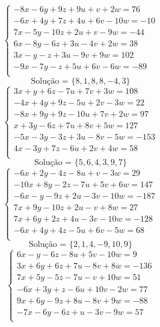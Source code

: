 \documentclass[12pt,oneside,a4paper]{article}
\begin{document}
\vspace{\baselineskip}
\begin{equation*}
\begin{cases}
-8x-6y+9z+9u+v+2w=76 \\
-6x+4y+7z+4u+6v-10w=-10 \\
7x-5y-10z+2u+v-9w=-44 \\
6x-8y-6z+3u-4v+2w=38 \\
3x-y-z+3u-9v+9w=102 \\
-9x-7y-z+5u+6v-6w=-89 \\
\end{cases}
\end{equation*}
\begin{equation*}
\text{Solução = }\{8,1,8,8,-4,3\}
\end{equation*}
\vspace{\baselineskip}
\begin{equation*}
\begin{cases}
3x+y+6z-7u+7v+3w=108 \\
-4x+4y+9z-5u+2v-3w=22 \\
-8x+9y+9z-10u+7v+2w=97 \\
x+3y-6z+7u+8v+5w=127 \\
-5x-3y-3z+3u-8v-5w=-153 \\
4x-3y+7z-6u+2v+4w=58 \\
\end{cases}
\end{equation*}
\begin{equation*}
\text{Solução = }\{5,6,4,3,9,7\}
\end{equation*}
\vspace{\baselineskip}
\begin{equation*}
\begin{cases}
-6x+2y-4z-8u+v-3w=29 \\
-10x+8y-2z-7u+5v+6w=147 \\
-6x-y-9z+2u-3v-10w=-187 \\
7x+9y-10z+2u-v+8w=27 \\
7x+6y+2z+4u-3v-10w=-128 \\
-6x+4y+4z-5u+6v-5w=68 \\
\end{cases}
\end{equation*}
\begin{equation*}
\text{Solução = }\{2,1,4,-9,10,9\}
\end{equation*}
\vspace{\baselineskip}
\begin{equation*}
\begin{cases}
6x-y-6z-8u+5v-10w=9 \\
3x+6y+6z+7u-8v+8w=-136 \\
7x+5y-5z-7u-v+10w=51 \\
-6x+3y+z-6u+10v-2w=77 \\
9x+6y-9z+8u-8v+9w=-88 \\
-7x-6y-6z+u-3v-9w=57 \\
\end{cases}
\end{equation*}
\end{document}
